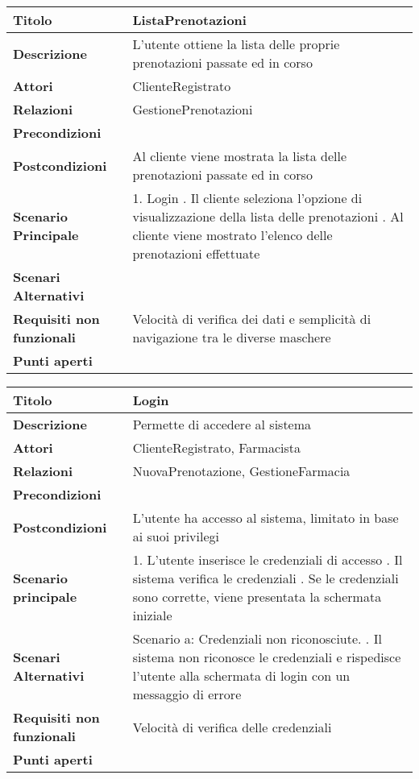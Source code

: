 \begin{tabular} {|P{4.5cm}|P{12.5cm}|}
\hline
  \textbf{Titolo} & ListaPrenotazioni\\
\hline
  \textbf{Descrizione} & L'utente ottiene la lista delle proprie prenotazioni passate ed in corso\\
\hline
 \textbf{Attori} & ClienteRegistrato\\
\hline
  \textbf{Relazioni} & GestionePrenotazioni\\
\hline
  \textbf{Precondizioni} &\\
\hline
  \textbf{Postcondizioni} & Al cliente viene mostrata la lista delle prenotazioni passate ed in corso\\
\hline
  \textbf{Scenario Principale} & 1. Login . Il cliente seleziona l'opzione di visualizzazione della lista delle prenotazioni . Al cliente viene mostrato l'elenco delle prenotazioni effettuate\\
\hline
  \textbf{Scenari Alternativi} &\\
\hline
  \textbf{Requisiti non funzionali} & Velocità di verifica dei dati e semplicità di navigazione tra le diverse maschere\\
\hline
  \textbf{Punti aperti} &\\
\hline
\end{tabular}
\hfill
\break

\begin{tabular} {|P{4.5cm}|P{12.5cm}|}
\hline
  \textbf{Titolo} & Login\\
\hline
  \textbf{Descrizione} & Permette di accedere al sistema\\
\hline
  \textbf{Attori} & ClienteRegistrato, Farmacista\\
\hline
  \textbf{Relazioni} & NuovaPrenotazione, GestioneFarmacia\\
\hline
  \textbf{Precondizioni} &\\
\hline
  \textbf{Postcondizioni} & L'utente ha accesso al sistema, limitato in base ai suoi privilegi\\
\hline
  \textbf{Scenario principale} & 1. L'utente inserisce le credenziali di accesso . Il sistema verifica le credenziali . Se le credenziali sono corrette, viene presentata la schermata iniziale\\
\hline
  \textbf{Scenari Alternativi} & Scenario a: Credenziali non riconosciute. . Il sistema non riconosce le credenziali e rispedisce l'utente alla schermata di login con un messaggio di errore\\
\hline
  \textbf{Requisiti non funzionali} & Velocità di verifica delle credenziali\\
\hline
  \textbf{Punti aperti} &\\
\hline
\end{tabular}
\hfill
\break

